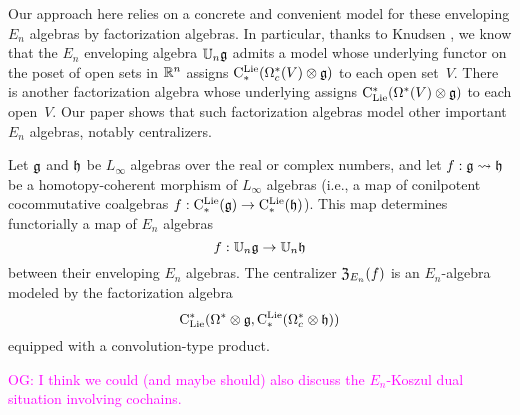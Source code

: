 \documentclass[11pt]{amsart}
\numberwithin{equation}{section}
\def\owen{\textcolor{magenta}{OG: }\textcolor{magenta}}
\begin{document}
Our approach here relies on a concrete and convenient model for these enveloping $E_n$ algebras by factorization algebras.
In particular, thanks to Knudsen \cite{Knudsen}, 
we know that the $E_n$ enveloping algebra $\mathbb U_n \mathfrak g$ admits a model whose underlying functor on the poset of open sets in $\mathbb R^n$ assigns ${\rm C}^{\rm Lie}_*(\Omega_c^*(V) \otimes \mathfrak g)$ to each open set~$V$.
There is another factorization algebra whose underlying assigns ${\rm C}_{\rm Lie}^*(\Omega^*(V) \otimes \mathfrak g)$ to each open~$V$.
Our paper shows that such factorization algebras model other important $E_n$ algebras, notably centralizers.

\begin{thm}
\label{thm: centralizer}
Let $\mathfrak g$ and $\mathfrak h$ be $L_\infty$ algebras over the real or complex numbers, 
and let $f: \mathfrak g \rightsquigarrow \mathfrak h$ be a homotopy-coherent morphism of $L_\infty$ algebras
(i.e., a map of conilpotent cocommutative coalgebras $f: {\rm C}^{\rm Lie}_*(\mathfrak g) \to {\rm C}^{\rm Lie}_*(\mathfrak h)$).
This map determines functorially a map of $E_n$ algebras
\[
f: \mathbb U_n \mathfrak g \to \mathbb U_n \mathfrak h
\]
between their enveloping $E_n$ algebras.
The centralizer ${\frak Z}_{E_n}(f)$ is an $E_n$-algebra modeled by the factorization algebra 
\[
{\rm C}_{\rm Lie}^*(\Omega^* \otimes \mathfrak g, {\rm C}^{\rm Lie}_*(\Omega^*_c \otimes \mathfrak h))
\]
equipped with a convolution-type product.
\end{thm}

\owen{I think we could (and maybe should) also discuss the $E_n$-Koszul dual situation involving cochains.}

\def\Disk{{\rm Disk}}
\end{document}
